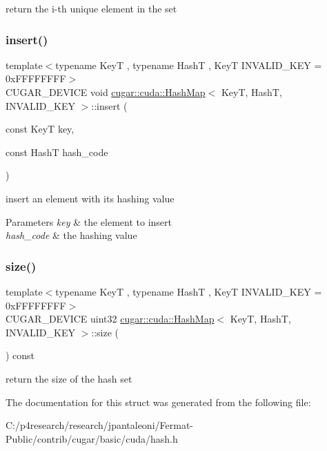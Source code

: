 return the i-\/th unique element in the set \mbox{\label{structcugar_1_1cuda_1_1_hash_map_acbef3382463b59782820e26370ed0794}} 
\subsubsection{\texorpdfstring{insert()}{insert()}}
{\footnotesize\ttfamily template$<$typename KeyT , typename HashT , KeyT I\+N\+V\+A\+L\+I\+D\+\_\+\+K\+EY = 0x\+F\+F\+F\+F\+F\+F\+FF$>$ \\
C\+U\+G\+A\+R\+\_\+\+D\+E\+V\+I\+CE void \hyperlink{structcugar_1_1cuda_1_1_hash_map}{cugar\+::cuda\+::\+Hash\+Map}$<$ KeyT, HashT, I\+N\+V\+A\+L\+I\+D\+\_\+\+K\+EY $>$\+::insert (\begin{DoxyParamCaption}\item[{const KeyT}]{key,  }\item[{const HashT}]{hash\+\_\+code }\end{DoxyParamCaption})\hspace{0.3cm}{\ttfamily [inline]}}

insert an element with its hashing value


\begin{DoxyParams}{Parameters}
{\em key} & the element to insert \\
\hline
{\em hash\+\_\+code} & the hashing value \\
\hline
\end{DoxyParams}
\mbox{\label{structcugar_1_1cuda_1_1_hash_map_ac36b53b042954823ba4da7bc78f09af5}} 
\subsubsection{\texorpdfstring{size()}{size()}}
{\footnotesize\ttfamily template$<$typename KeyT , typename HashT , KeyT I\+N\+V\+A\+L\+I\+D\+\_\+\+K\+EY = 0x\+F\+F\+F\+F\+F\+F\+FF$>$ \\
C\+U\+G\+A\+R\+\_\+\+D\+E\+V\+I\+CE uint32 \hyperlink{structcugar_1_1cuda_1_1_hash_map}{cugar\+::cuda\+::\+Hash\+Map}$<$ KeyT, HashT, I\+N\+V\+A\+L\+I\+D\+\_\+\+K\+EY $>$\+::size (\begin{DoxyParamCaption}{ }\end{DoxyParamCaption}) const\hspace{0.3cm}{\ttfamily [inline]}}

return the size of the hash set 

The documentation for this struct was generated from the following file\+:\begin{DoxyCompactItemize}
\item 
C\+:/p4research/research/jpantaleoni/\+Fermat-\/\+Public/contrib/cugar/basic/cuda/hash.\+h\end{DoxyCompactItemize}
